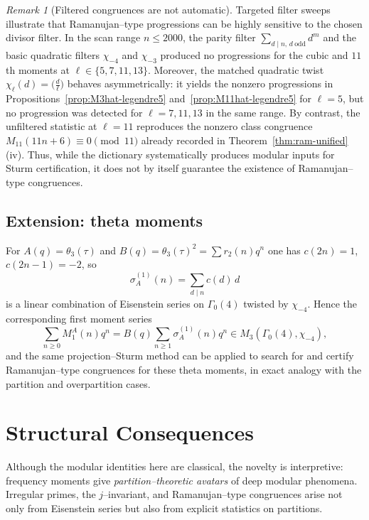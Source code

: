 \documentclass[11pt]{article}
\theoremstyle{definition}
\theoremstyle{remark}
\newtheorem{remark}[theorem]{Remark}
\begin{document}
\begin{remark}[Filtered congruences are not automatic]\label{rem:filters-not-automatic}
Targeted filter sweeps illustrate that Ramanujan--type progressions can be
highly sensitive to the chosen divisor filter.  In the scan range $n\le 2000$,
the parity filter $\sum_{d\mid n,\, d\ \mathrm{odd}} d^m$ and the basic quadratic
filters $\chi_{-4}$ and $\chi_{-3}$ produced no progressions for the cubic and
$11$th moments at $\ell\in\{5,7,11,13\}$.  Moreover, the matched quadratic twist
$\chi_\ell(d)=\big(\frac{d}{\ell}\big)$ behaves asymmetrically: it yields the
nonzero progressions in
Propositions~\ref{prop:M3hat-legendre5} and~\ref{prop:M11hat-legendre5} for
$\ell=5$, but no progression was detected for $\ell=7,11,13$ in the same range.
By contrast, the unfiltered statistic at $\ell=11$ reproduces the nonzero class
congruence $M_{11}(11n+6)\equiv 0\pmod{11}$ already recorded in
Theorem~\ref{thm:ram-unified}(iv).
Thus, while the dictionary systematically produces modular inputs for Sturm
certification, it does not by itself guarantee the existence of Ramanujan--type
congruences.
\end{remark}




\subsection{Extension: theta moments}\label{sec:theta-extension}

For $A(q)=\theta_3(\tau)$ and $B(q)=\theta_3(\tau)^2=\sum r_2(n)q^n$ one has
$c(2n)=1$, $c(2n-1)=-2$, so
\[
\sigma_A^{(1)}(n)=\sum_{d\mid n}c(d)\,d
\]
is a linear combination of Eisenstein series on $\Gamma_0(4)$ twisted by
$\chi_{-4}$. Hence the corresponding first moment series
\[
\sum_{n\ge0}M^A_1(n)q^n
= B(q)\sum_{n\ge1}\sigma_A^{(1)}(n)q^n
\in M_3(\Gamma_0(4),\chi_{-4}),
\]
and the same projection--Sturm method can be applied to search for and
certify Ramanujan--type congruences for these theta moments, in exact
analogy with the partition and overpartition cases.


\section{Structural Consequences}\label{sec:higher}

Although the modular identities here are classical, the novelty is
interpretive: frequency moments give \emph{partition--theoretic avatars}
of deep modular phenomena. Irregular primes, the $j$--invariant, and
Ramanujan--type congruences arise not only from Eisenstein series but
also from explicit statistics on partitions.
\end{document}

